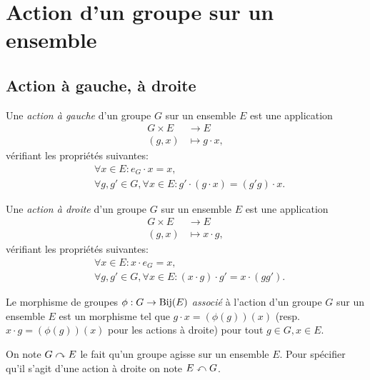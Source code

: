 \section{Action d'un groupe sur un ensemble}
\subsection{Action à gauche, à droite}

\begin{defn}
	Une \emph{action à gauche} d'un groupe $G$ sur un ensemble $E$ est une application
	\begin{align*}
		G \times E &\to E \\
		(g, x) &\mapsto g \cdot x,
	\end{align*}
	vérifiant les propriétés suivantes:
	\begin{align*}
		& \forall x \in E: e_G \cdot x = x, \\
		& \forall g, g' \in G, \forall x \in E:
			g' \cdot (g \cdot x) = (g' g) \cdot x.
	\end{align*}
\end{defn}

\begin{defn}
	Une \emph{action à droite} d'un groupe $G$ sur un ensemble $E$ est une application
	\begin{align*}
		G \times E &\to E \\
		(g, x) &\mapsto x \cdot g,
	\end{align*}
	vérifiant les propriétés suivantes:
	\begin{align*}
		& \forall x \in E: x \cdot e_G = x, \\
		& \forall g, g' \in G, \forall x \in E:
			(x \cdot g) \cdot g' = x \cdot (g g').
	\end{align*}
\end{defn}

\begin{defn}
	Le morphisme de groupes $\phi : G \to \operatorname{Bij}(E)$ \emph{associé} à l'action d'un
	groupe $G$ sur un ensemble $E$ est un morphisme tel que $g \cdot x = (\phi(g))(x)$
	(resp. $x \cdot g = (\phi(g))(x)$ pour les actions à droite)
	pour tout $g \in G, x \in E$.
\end{defn}

\begin{notn}
	On note $G \curvearrowright E$ le fait qu'un groupe agisse sur un ensemble $E$.
	Pour spécifier qu'il s'agit d'une action à droite on note $E \curvearrowleft G$.
\end{notn}

